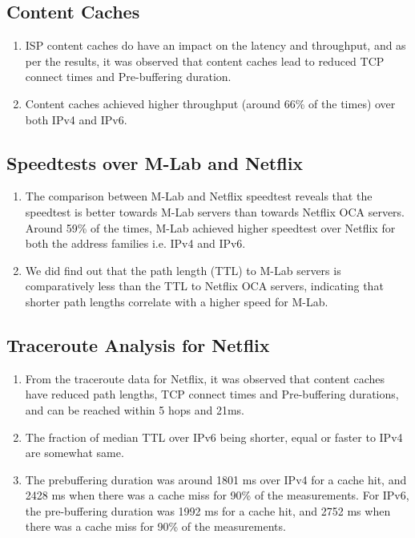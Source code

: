 \subsection*{Content Caches}
 \begin{enumerate}
  \item ISP content caches do have an impact on the latency and throughput, and as per the results, it was observed that content caches lead to reduced TCP connect times and Pre-buffering duration.
  \item Content caches achieved higher throughput (around 66\% of the times) over both IPv4 and IPv6.
\end{enumerate}
 
\subsection*{Speedtests over M-Lab and Netflix}
\begin{enumerate}
  \item The comparison between M-Lab and Netflix speedtest reveals that the speedtest is better towards M-Lab servers than towards Netflix OCA servers. Around 59\% of the times, M-Lab achieved higher speedtest over Netflix
for both the address families i.e. IPv4 and IPv6.
  \item We did find out that the path length (TTL) to M-Lab servers is comparatively less than the TTL to Netflix OCA servers, indicating that shorter path lengths correlate with a higher speed for M-Lab.
\end{enumerate}

\subsection*{Traceroute Analysis for Netflix}
\begin{enumerate}
  \item From the traceroute data for Netflix, it was observed that content caches have reduced path lengths, TCP connect times and Pre-buffering durations, and can be reached within 5 hops and 21ms.
  \item The fraction of median TTL over IPv6 being shorter, equal or faster to IPv4 are somewhat same.
  \item The prebuffering duration was around 1801 ms over IPv4 for a cache hit, and 2428 ms when there was a cache miss for 90\% of the measurements. For IPv6, the pre-buffering duration was 1992 ms for a cache hit, and 2752 ms when there was a cache miss for 90\% of the measurements. 
\end{enumerate}